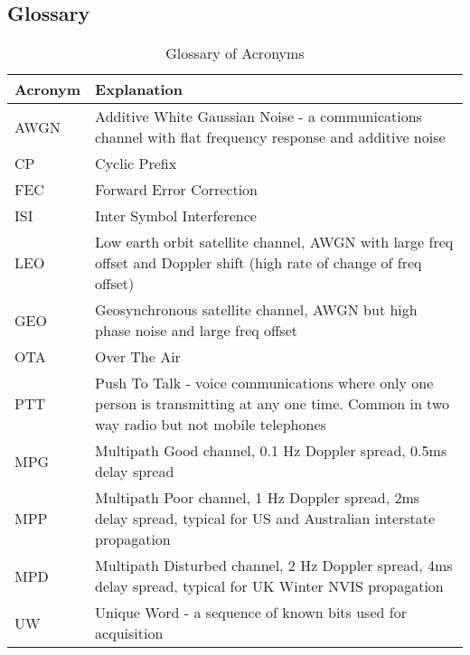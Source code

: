 \documentclass{article}
\begin{document}
\clearpage

\subsection{Glossary}

\begin{table}[h]
\centering
\begin{tabular}{l p{8cm} }
 \hline
 Acronym & Explanation \\
 \hline
 AWGN & Additive White Gaussian Noise - a communications channel with flat frequency response and additive noise \\
 CP & Cyclic Prefix \\
 FEC & Forward Error Correction \\
 ISI & Inter Symbol Interference \\
 LEO & Low earth orbit satellite channel, AWGN with large freq offset and Doppler shift (high rate of change of freq offset) \\
 GEO & Geosynchronous satellite channel, AWGN but high phase noise and large freq offset \\
 OTA & Over The Air \\
 PTT & Push To Talk - voice communications where only one person is transmitting at any one time.  Common in two way radio but not mobile telephones  \\
 MPG & Multipath Good channel, 0.1 Hz Doppler spread, 0.5ms delay spread \\
 MPP & Multipath Poor channel, 1 Hz Doppler spread, 2ms delay spread, typical for US and Australian interstate propagation \\
 MPD & Multipath Disturbed channel, 2 Hz Doppler spread, 4ms delay spread, typical for UK Winter NVIS propagation \\
 UW & Unique Word - a sequence of known bits used for acquisition \\
 \hline
\end{tabular}
\caption{Glossary of Acronyms}
\end{table}
\end{document}

